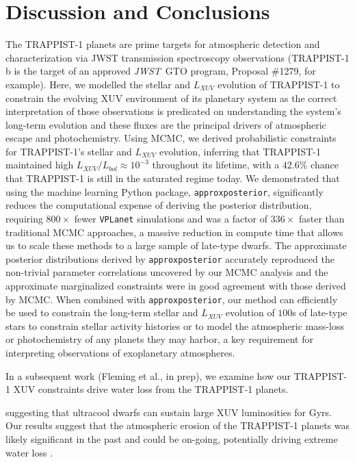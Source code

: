 \documentclass[twocolumn]{aastex62}
\newcommand{\vplanet}[0]{\texttt{VPLanet}\xspace}
\newcommand{\approxposterior}[0]{\texttt{approxposterior}\xspace}
\newcommand{\jwst}[0]{\textit{JWST}\xspace}
\begin{document}

\section{Discussion and Conclusions} \label{sec:discussion}

The TRAPPIST-1 planets are prime targets for atmospheric detection and characterization via JWST transmission spectroscopy observations (TRAPPIST-1 b is the target of an approved \jwst~GTO program, Proposal \#1279, for example). Here, we modelled the stellar and $L_{XUV}$ evolution of TRAPPIST-1 to constrain the evolving XUV environment of its planetary system as the correct interpretation of those observations is predicated on understanding the system's long-term evolution and these fluxes are the principal drivers of atmospheric escape and photochemistry. Using MCMC, we derived probabilistic constraints for TRAPPIST-1's stellar and $L_{XUV}$ evolution, inferring that TRAPPIST-1 maintained high $L_{XUV}/L_{bol} \approx 10^{-3}$ throughout its lifetime, with a $42.6\%$ chance that TRAPPIST-1 is still in the saturated regime today.  We demonstrated that using the machine learning Python package, \approxposterior \citep{FlemingVanderPlas2018}, significantly reduces the computational expense of deriving the posterior distribution, requiring $800\times$ fewer \vplanet simulations and was a factor of $336\times$ faster than traditional MCMC approaches, a massive reduction in compute time that allows us to scale these methods to a large sample of late-type dwarfs. The approximate posterior distributions derived by \approxposterior accurately reproduced the non-trivial parameter correlations uncovered by our MCMC analysis and the approximate marginalized constraints were in good agreement with those derived by MCMC. When combined with \approxposterior, our method can efficiently be used to constrain the long-term stellar and $L_{XUV}$ evolution of $100$s of late-type stars to constrain stellar activity histories or to model the atmospheric mass-loss or photochemistry of any planets they may harbor, a key requirement for interpreting observations of exoplanetary atmospheres.

In a subsequent work (Fleming et al., in prep), we examine how our TRAPPIST-1 XUV constraints drive water loss from the TRAPPIST-1 planets.

suggesting that ultracool dwarfs can sustain large XUV luminosities for Gyrs. Our results suggest that the atmospheric erosion of the TRAPPIST-1 planets was likely significant in the past and could be on-going, potentially driving extreme water loss \citep{Bolmont2017,Bourrier2017a}.
\end{document}
